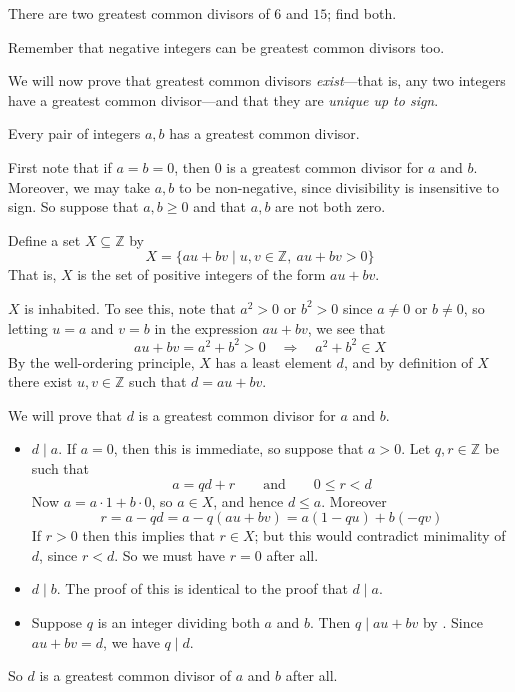 \begin{exercise}
\label{exGCDofSixAndFifteen}
There are two greatest common divisors of $6$ and $15$; find both.
\begin{backhint}
Remember that negative integers can be greatest common divisors too.
\end{backhint}
\end{exercise}

We will now prove that greatest common divisors \textit{exist}---that is, any two integers have a greatest common divisor---and that they are \textit{unique up to sign}.

\begin{theorem}
\label{thmGCDsExist}
Every pair of integers $a,b$ has a greatest common divisor.
\end{theorem}
\begin{cproof}
First note that if $a=b=0$, then $0$ is a greatest common divisor for $a$ and $b$. Moreover, we may take $a,b$ to be non-negative, since divisibility is insensitive to sign. So suppose that $a, b \ge 0$ and that $a,b$ are not both zero.

Define a set $X \subseteq \mathbb{Z}$ by
\[ X = \{ au+bv \mid u,v \in \mathbb{Z},\ au+bv > 0 \} \]
That is, $X$ is the set of positive integers of the form $au+bv$.

$X$ is inhabited. To see this, note that $a^2 > 0$ or $b^2 > 0$ since $a \ne 0$ or $b \ne 0$, so letting $u=a$ and $v=b$ in the expression $au+bv$, we see that
\[ au+bv=a^2+b^2>0 \quad \Rightarrow \quad a^2+b^2 \in X \]
By the well-ordering principle, $X$ has a least element $d$, and by definition of $X$ there exist $u,v \in \mathbb{Z}$ such that $d = au+bv$.

We will prove that $d$ is a greatest common divisor for $a$ and $b$.
\begin{itemize}
\item $d \mid a$. If $a=0$, then this is immediate, so suppose that $a > 0$. Let $q,r \in \mathbb{Z}$ be such that \[ a=qd+r \qquad \text{and} \qquad 0 \le r < d \]
Now $a = a \cdot 1 + b \cdot 0$, so $a \in X$, and hence $d \le a$. Moreover
\[ r = a-qd = a-q(au+bv) = a(1-qu) + b(-qv) \]
If $r>0$ then this implies that $r \in X$; but this would contradict minimality of $d$, since $r < d$. So we must have $r=0$ after all.
\item $d \mid b$. The proof of this is identical to the proof that $d \mid a$.
\item Suppose $q$ is an integer dividing both $a$ and $b$. Then $q \mid au+bv$ by . Since $au+bv=d$, we have $q \mid d$.
\end{itemize}
So $d$ is a greatest common divisor of $a$ and $b$ after all.
\end{cproof}

